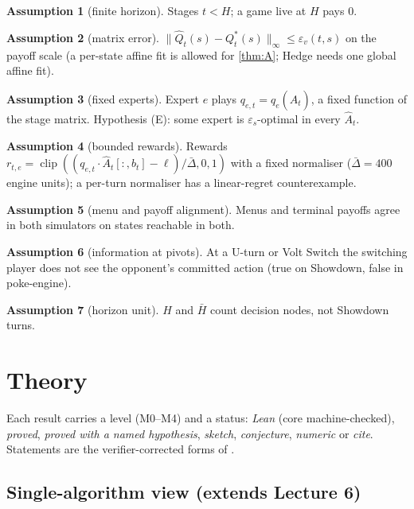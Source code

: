 \documentclass[10pt]{article}
\theoremstyle{plain}
\theoremstyle{definition}
\newtheorem{assumption}{Assumption}
\theoremstyle{remark}
\DeclareMathOperator{\clip}{clip}
\newcommand{\epss}{\varepsilon_s}
\newcommand{\epsv}{\varepsilon_v}
\newcommand{\Hbar}{\bar H}
\newcommand{\Qhat}{\hat Q}
\newcommand{\Ahat}{\hat A}
\newcommand{\src}[1]{\path{#1}}
\begin{document}
\begin{assumption}[finite horizon]\label{asm:A6} Stages $t<H$; a game live at $H$ pays 0.\end{assumption}
\begin{assumption}[matrix error]\label{asm:A7} $\|\Qhat_t(s)-Q^*_t(s)\|_\infty\le\epsv(t,s)$ on the payoff scale (a
per-state affine fit is allowed for \cref{thm:A}; Hedge needs one global affine fit).\end{assumption}
\begin{assumption}[fixed experts]\label{asm:A8} Expert $e$ plays $q_{e,t}=q_e(\Ahat_t)$, a fixed function of the stage
matrix. Hypothesis (E): some expert is $\epss$-optimal in every $\Ahat_t$.\end{assumption}
\begin{assumption}[bounded rewards]\label{asm:A9} Rewards $r_{t,e}=\clip((q_{e,t}\cdot\Ahat_t[:,b_t]-\ell)/\bar\Delta,0,1)$
with a fixed normaliser ($\bar\Delta=400$ engine units); a per-turn normaliser has a linear-regret
counterexample.\end{assumption}
\begin{assumption}[menu and payoff alignment]\label{asm:A10} Menus and terminal payoffs agree in both simulators on
states reachable in both.\end{assumption}
\begin{assumption}[information at pivots]\label{asm:A11} At a U-turn or Volt Switch the switching player does not see
the opponent's committed action (true on Showdown, false in poke-engine).\end{assumption}
\begin{assumption}[horizon unit]\label{asm:A12} $H$ and $\Hbar$ count decision nodes, not Showdown turns.\end{assumption}

\section{Theory}\label{sec:theory}

Each result carries a level (M0--M4) and a status: \emph{Lean} (core machine-checked), \emph{proved}, \emph{proved with
a named hypothesis}, \emph{sketch}, \emph{conjecture}, \emph{numeric} or \emph{cite}. Statements are the
verifier-corrected forms of \src{theory/theory_map.md}.

\subsection{Single-algorithm view (extends Lecture 6)}\label{sec:L6lens}
\end{document}
